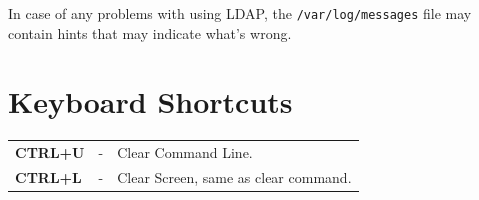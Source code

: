 \documentclass{report}
\begin{document}
	In case of any problems with using LDAP, the \verb|/var/log/messages| file may contain hints that may indicate what's wrong. 
	
	\chapter{Keyboard Shortcuts}
	\begin{tabular}{lcl}
		\textbf{CTRL+U} &- &Clear Command Line. \\
		\textbf{CTRL+L} &- &Clear Screen, same as clear command. \\
	\end{tabular}
\end{document}
